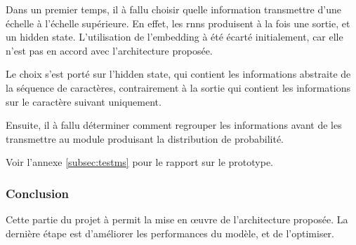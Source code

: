\vspace{1em}
Dans un premier temps, il à fallu choisir quelle information transmettre d'une échelle à l'échelle supérieure. En effet, les \glspl{rnn} produisent à la fois une sortie, et un \gls{hidden state}. L'utilisation de l'\gls{embedding} à été écarté initialement, car elle n'est pas en accord avec l'architecture proposée.

Le choix s'est porté sur l'\gls{hidden state}, qui contient les informations abstraite de la séquence de caractères, contrairement à la sortie qui contient les informations sur le caractère suivant uniquement.



Ensuite, il à fallu déterminer comment regrouper les informations avant de les transmettre au module produisant la distribution de probabilité.


Voir l'annexe \ref{subsec:testms} pour le rapport sur le prototype. 

\subsubsection{Conclusion}
Cette partie du projet à permit la mise en œuvre de l'architecture proposée. La dernière étape est d'améliorer les performances du modèle, et de l'optimiser.